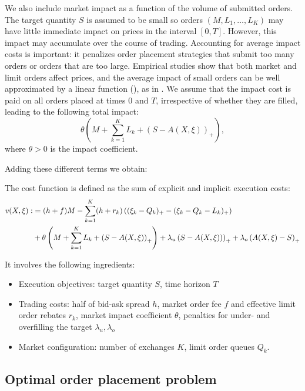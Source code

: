 \documentclass[opre,nonblindrev]{informs3}
\begin{document}
We also include market impact as a function of the volume of submitted orders. The target quantity $S$ is assumed to be small so orders $(M,L_1,\dots,L_K)$ may have little immediate impact on prices in the interval $[0,T]$. However, this impact may accumulate over the course of trading. Accounting for average impact costs is important: it penalizes order placement strategies that submit too many orders or orders that are too large. Empirical studies show that both market and limit orders affect prices, and the average impact of small orders can be well approximated by a linear function (\cite{ContKukanov2013}),  as in \cite{Kyle1985}. We assume that the impact cost is paid on all orders placed at times $0$ and $T$, irrespective of whether they are filled, leading to the following total impact:
\begin{equation}\label{optim.impact}
\theta\left(M+\sum_{k=1}^KL_k+\left(S - A(X,\xi)\right)_+\right),
\end{equation}
\noindent where $\theta>0$ is the impact coefficient.

Adding these different terms we obtain:
\begin{definition}
The cost function  is defined as the sum of explicit and implicit execution costs:
\begin{align}
v(X,\xi):&=(h+f)M-\sum_{k=1}^K(h+r_k)\left((\xi_k-Q_k)_+-(\xi_k-Q_k-L_k)_+\right) \notag\\
&+\theta\left(M+\sum_{k=1}^KL_k + \left(S - A(X,\xi)\right)_+\right) + \lambda_u\left(S - A(X,\xi))\right)_+
+\lambda_o\left(A(X,\xi)-S\right)_+ \label{eq.V}
\end{align}
\end{definition}
It involves the following ingredients:
\begin{itemize}
\item Execution objectives: target quantity $S$, time horizon $T$
\item Trading costs: half of bid-ask spread $h$, market order fee $f$ and effective limit order rebates $r_k$, market impact coefficient $\theta$, penalties for under- and overfilling the target $\lambda_u, \lambda_o$
\item Market configuration: number of exchanges $K$, limit order queues $Q_k$.
\end{itemize}
\subsection{Optimal order placement problem}
\end{document}
